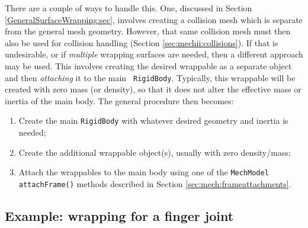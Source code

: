 There are a couple of ways to handle this. One, discussed in Section
\ref{GeneralSurfaceWrapping:sec}, involves creating a collision mesh
which is separate from the general mesh geometry. However, that same
collision mesh must then also be used for collision handling (Section
\ref{sec:mechii:collisions}). If that is undesirable, or if {\it
multiple} wrapping surfaces are needed, then a different approach may
be used. This involves creating the desired wrappable as a separate
object and then {\it attaching} it to the main {\tt
RigidBody}. Typically, this wrappable will be created with zero mass
(or density), so that it does not alter the effective mass or inertia
of the main body. The general procedure then becomes:

\begin{enumerate}

\item Create the main {\tt RigidBody} with whatever desired geometry
and inertia is needed;

\item Create the additional wrappable object(s), usually
with zero density/mass;

\item Attach the wrappables to the main body using
one of the {\tt MechModel} {\tt attachFrame()} methods described in
Section \ref{sec:mech:frameattachments}.

\end{enumerate}

\subsection{Example: wrapping for a finger joint}
\label{PhalanxWrapping:sec}

